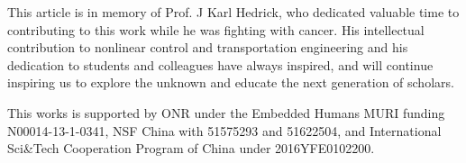 \begin{acknowledgment}
This article is in memory of Prof. J Karl Hedrick, who dedicated valuable time to contributing to this work while he was fighting with cancer. 
His intellectual contribution to nonlinear control and transportation engineering and his dedication to students and colleagues have always inspired, and will continue inspiring us to explore the unknown and educate the next generation of scholars.

This works is supported by ONR under the Embedded Humans MURI funding N00014-13-1-0341, NSF China with 51575293 and 51622504, and International Sci\&Tech Cooperation Program of China under 2016YFE0102200.
\end{acknowledgment}
